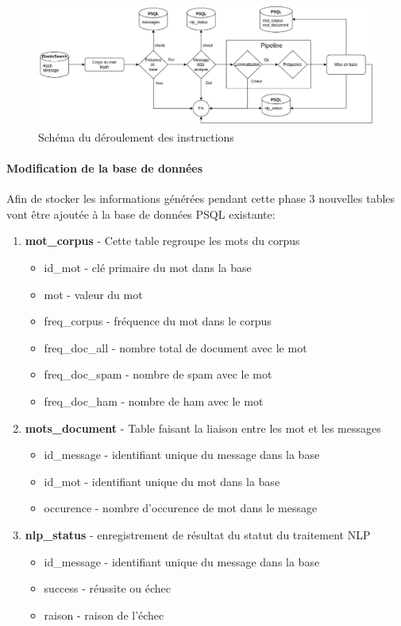 \documentclass[a4paper,12pt]{article}
\begin{document}
		 \begin{figure}[H]
				\includegraphics[width=\linewidth]{img/p2schema.png}
				\caption{Schéma du déroulement des instructions}
		\end{figure}
		 
		 
		 \paragraph{Modification de la base de données}
		 	Afin de stocker les informations générées pendant cette phase 3 nouvelles tables vont être ajoutée à la base de données PSQL existante:
		 	\begin{enumerate}
		 		\item \textbf{mot\_corpus} - Cette table regroupe les mots du corpus
		 			\begin{itemize}
		 				\item id\_mot - clé primaire du mot dans la base
		 				\item mot - valeur du mot
		 				\item freq\_corpus - fréquence du mot dans le corpus
		 				\item freq\_doc\_all - nombre total de document avec le mot
		 				\item freq\_doc\_spam - nombre de spam avec le mot
		 				\item freq\_doc\_ham - nombre de ham avec le mot
		 			\end{itemize}
		 		\item \textbf{mots\_document} - Table faisant la liaison entre les mot et les messages
		 			\begin{itemize}
		 				\item id\_message - identifiant unique du message dans la base
		 				\item id\_mot - identifiant unique du mot dans la base
		 				\item occurence - nombre d'occurence de mot dans le message
		 			\end{itemize}
		 		\item \textbf{nlp\_status} - enregistrement de résultat du statut du traitement NLP
		 			\begin{itemize}
		 				\item id\_message - identifiant unique du message dans la base
		 				\item success - réussite ou échec
		 				\item raison - raison de l'échec
		 			\end{itemize}
		 	\end{enumerate}
		 	
\end{document}
